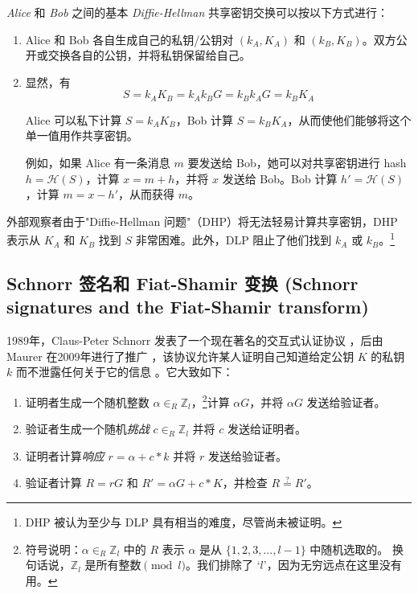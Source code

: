 {\em Alice} 和 {\em Bob} 之间的基本 {\em Diffie-Hellman} \cite{Diffie-Hellman} 共享密钥交换可以按以下方式进行：

\begin{enumerate}
	\item Alice 和 Bob 各自生成自己的私钥/公钥对 \((k_A, K_A) \textrm{ 和 } (k_B, K_B)\)。双方公开或交换各自的公钥，并将私钥保留给自己。

	\item 显然，有 \[S = k_A K_B = k_A k_B G = k_B k_A G = k_B K_A\]

	Alice 可以私下计算 \(S = k_A K_B\)，Bob 计算 \(S = k_B K_A\)，从而使他们能够将这个单一值用作共享密钥。

	例如，如果 Alice 有一条消息 $m$ 要发送给 Bob，她可以对共享密钥进行 hash \(h = \mathcal{H}(S)\)，计算 $x = m + h$，并将 $x$ 发送给 Bob。Bob 计算 $h' = \mathcal{H}(S)$，计算 $m = x - h'$，从而获得 $m$。
\end{enumerate}   

外部观察者由于"Diffie-Hellman 问题"（DHP）将无法轻易计算共享密钥，DHP 表示从 $K_A$ 和 $K_B$ 找到 $S$ 非常困难。此外，DLP 阻止了他们找到 $k_A$ 或 $k_B$。\footnote{DHP 被认为至少与 DLP 具有相当的难度，尽管尚未被证明。\cite{diffie-hellman-problem}}


\subsection{Schnorr 签名和 Fiat-Shamir 变换 (Schnorr signatures and the Fiat-Shamir transform)}
\label{sec:schnorr-fiat-shamir}

1989年，Claus-Peter Schnorr 发表了一个现在著名的交互式认证协议 \cite{schnorr-signatures}，后由 Maurer 在2009年进行了推广 \cite{simple-zk-proof-maurer}，该协议允许某人证明自己知道给定公钥 $K$ 的私钥 $k$ 而不泄露任何关于它的信息 \cite{Signatures2015BorromeanRS}。它大致如下：

\begin{enumerate}
	\item 证明者生成一个随机整数 \(\alpha \in_R \mathbb{Z}_l\)，\footnote{\label{notation3_note}符号说明：\(\alpha \in_R \mathbb{Z}_l\) 中的 $R$ 表示 $\alpha$ 是从 \(\{1,2,3,...,l-1\}\) 中随机选取的。 换句话说，$\mathbb{Z}_l$ 是所有整数$\pmod l$。我们排除了 `$l$'，因为无穷远点在这里没有用。}计算 $\alpha G$，并将 $\alpha G$ 发送给验证者。
	\item 验证者生成一个随机{\em 挑战} $c \in_R \mathbb{Z}_l$ 并将 $c$ 发送给证明者。
	\item 证明者计算{\em 响应} $r = \alpha + c*k$ 并将 $r$ 发送给验证者。
	\item 验证者计算 $R = r G$ 和 $R' = \alpha G + c*K$，并检查 $R \stackrel{?}{=} R'$。
\end{enumerate}

